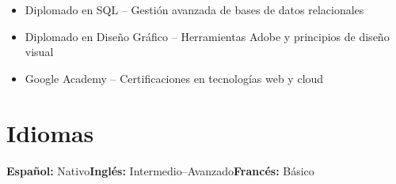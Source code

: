 \documentclass[10pt, letterpaper]{article}
\begin{document}
\begin{itemize}
  \item Diplomado en SQL – Gestión avanzada de bases de datos relacionales
  \item Diplomado en Diseño Gráfico – Herramientas Adobe y principios de diseño visual
  \item Google Academy – Certificaciones en tecnologías web y cloud
\end{itemize}

\section{Idiomas}

\textbf{Español:} Nativo\quad\textbf{Inglés:} Intermedio–Avanzado\quad\textbf{Francés:} Básico
\end{document}
